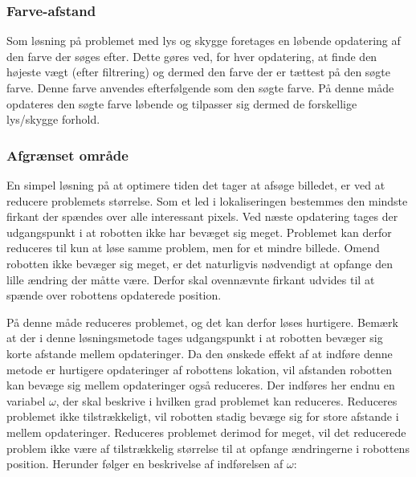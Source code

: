 \subsubsection{Farve-afstand}
Som løsning på problemet med lys og skygge foretages en løbende opdatering af den farve der søges efter.
Dette gøres ved, for hver opdatering, at finde den højeste vægt (efter filtrering) og dermed den farve der er tættest på den søgte farve.
Denne farve anvendes efterfølgende som den søgte farve.
På denne måde opdateres den søgte farve løbende og tilpasser sig dermed de forskellige lys/skygge forhold.

\subsubsection{Afgrænset område}
En simpel løsning på at optimere tiden det tager at afsøge billedet, er ved at reducere problemets størrelse.
Som et led i lokaliseringen bestemmes den mindste firkant der spændes over alle interessant pixels.
Ved næste opdatering tages der udgangspunkt i at robotten ikke har bevæget sig meget.
Problemet kan derfor reduceres til kun at løse samme problem, men for et mindre billede.
Omend robotten ikke bevæger sig meget, er det naturligvis nødvendigt at opfange den lille ændring der måtte være.
Derfor skal ovennævnte firkant udvides til at spænde over robottens opdaterede position.

På denne måde reduceres problemet, og det kan derfor løses hurtigere.
Bemærk at der i denne løsningsmetode tages udgangspunkt i at robotten bevæger sig korte afstande mellem opdateringer.
Da den ønskede effekt af at indføre denne metode er hurtigere opdateringer af robottens lokation, vil afstanden robotten kan bevæge sig mellem opdateringer også reduceres.
Der indføres her endnu en variabel $\omega$, der skal beskrive i hvilken grad problemet kan reduceres.
Reduceres problemet ikke tilstrækkeligt, vil robotten stadig bevæge sig for store afstande i mellem opdateringer.
Reduceres problemet derimod for meget, vil det reducerede problem ikke være af tilstrækkelig størrelse til at opfange ændringerne i robottens position.
Herunder følger en beskrivelse af indførelsen af $\omega$:

